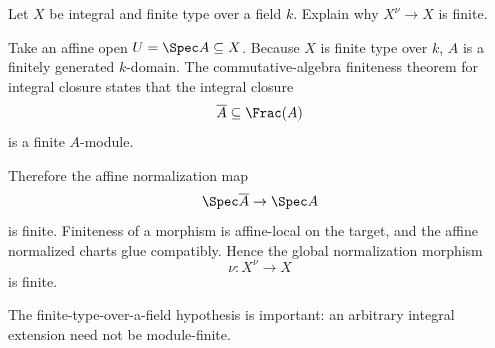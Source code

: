 \begin{problem}\label{prob:vi28-14}
Let \(X\) be integral and finite type over a field \(k\). Explain why \(X^\nu\to X\) is finite.

\end{problem}

\ifdefined\FullProblemDossiers
\begin{solution}
Take an affine open \(U=\Spec A\subseteq X\). Because \(X\) is finite type over \(k\), \(A\) is a finitely generated \(k\)-domain. The commutative-algebra finiteness theorem for integral closure states that the integral closure
\[
\overline A\subseteq\Frac(A)
\]
is a finite \(A\)-module.

Therefore the affine normalization map
\[
\Spec\overline A\to\Spec A
\]
is finite. Finiteness of a morphism is affine-local on the target, and the affine normalized charts glue compatibly. Hence the global normalization morphism
\[
\nu:X^\nu\to X
\]
is finite.

The finite-type-over-a-field hypothesis is important: an arbitrary integral extension need not be module-finite.
\end{solution}
\fi
